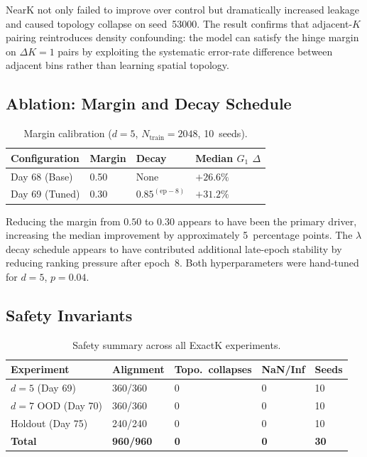 NearK not only failed to improve over control but dramatically increased leakage and caused topology collapse on seed~53000. The result confirms that adjacent-$K$ pairing reintroduces density confounding: the model can satisfy the hinge margin on $\Delta K{=}1$ pairs by exploiting the systematic error-rate difference between adjacent bins rather than learning spatial topology.

\subsection{Ablation: Margin and Decay Schedule}
\label{sec:ablation_margin}

\begin{table}[htbp]
\caption{Margin calibration ($d{=}5$, $N_{\text{train}}{=}2048$, 10~seeds).}
\label{tab:ablation_margin}
\begin{ruledtabular}
\begin{tabular}{llll}
Configuration & Margin & Decay & Median $G_1$ $\Delta$ \\
\hline
Day 68 (Base) & 0.50 & None & $+26.6\%$ \\
Day 69 (Tuned) & 0.30 & $0.85^{(\text{ep}-8)}$ & $+31.2\%$ \\
\end{tabular}
\end{ruledtabular}
\end{table}

Reducing the margin from $0.50$ to $0.30$ appears to have been the primary driver, increasing the median improvement by approximately 5~percentage points. The $\lambda$ decay schedule appears to have contributed additional late-epoch stability by reducing ranking pressure after epoch~8. Both hyperparameters were hand-tuned for $d{=}5$, $p{=}0.04$.

\subsection{Safety Invariants}

\begin{table}[htbp]
\caption{Safety summary across all ExactK experiments.}
\label{tab:safety}
\begin{ruledtabular}
\begin{tabular}{lllll}
Experiment & Alignment & Topo.\ collapses & NaN/Inf & Seeds \\
\hline
$d{=}5$ (Day 69) & 360/360 & 0 & 0 & 10 \\
$d{=}7$ OOD (Day 70) & 360/360 & 0 & 0 & 10 \\
Holdout (Day 75) & 240/240 & 0 & 0 & 10 \\
\textbf{Total} & \textbf{960/960} & \textbf{0} & \textbf{0} & \textbf{30} \\
\end{tabular}
\end{ruledtabular}
\end{table}
